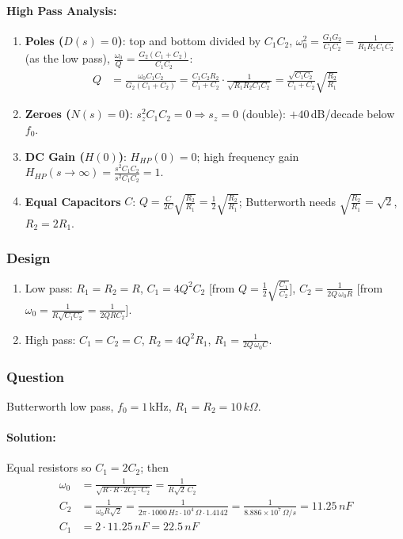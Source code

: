 \paragraph{High Pass Analysis:}
\begin{enumerate}
  \item \textbf{Poles (\(D(s) = 0\))}: top and bottom divided by \(C_1 C_2\),
    \(\omega_0^2 = \frac{G_1 G_2}{C_1 C_2} = \frac{1}{R_1 R_2 C_1 C_2}\) (as the low pass),
    \(\frac{\omega_0}{Q} = \frac{G_2 (C_1 + C_2)}{C_1 C_2}\):
    \begin{align*}
      Q &= \frac{\omega_0 C_1 C_2}{G_2 (C_1 + C_2)} = \frac{C_1 C_2 R_2}{C_1 + C_2}\cdot\frac{1}{\sqrt{R_1 R_2 C_1 C_2}}
         = \frac{\sqrt{C_1 C_2}}{C_1 + C_2}\sqrt{\frac{R_2}{R_1}}
    \end{align*}
  \item \textbf{Zeroes (\(N(s) = 0\))}: \(s_z^2 C_1 C_2 = 0 \Rightarrow s_z = 0\) (double): \(+40\,\)dB/decade below \(f_0\).
  \item \textbf{DC Gain (\(H(0)\))}: \(H_{HP}(0) = 0\); high frequency gain
    \(H_{HP}(s \to \infty) = \frac{s^2 C_1 C_2}{s^2 C_1 C_2} = 1\).
  \item \textbf{Equal Capacitors} \(C\): \(Q = \frac{C}{2C}\sqrt{\frac{R_2}{R_1}} = \frac{1}{2}\sqrt{\frac{R_2}{R_1}}\);
    Butterworth needs \(\sqrt{\frac{R_2}{R_1}} = \sqrt{2}\), \(R_2 = 2R_1\).
\end{enumerate}

\subsubsection{Design}
\begin{enumerate}
  \item Low pass: \(R_1 = R_2 = R\), \(C_1 = 4Q^2 C_2\) [from \(Q = \frac{1}{2}\sqrt{\frac{C_1}{C_2}}\)],
    \(C_2 = \frac{1}{2Q\,\omega_0 R}\) [from \(\omega_0 = \frac{1}{R\sqrt{C_1 C_2}} = \frac{1}{2Q R C_2}\)].
  \item High pass: \(C_1 = C_2 = C\), \(R_2 = 4Q^2 R_1\), \(R_1 = \frac{1}{2Q\,\omega_0 C}\).
\end{enumerate}

\subsubsection{Question}
Butterworth low pass, \(f_0 = 1\,\)kHz, \(R_1 = R_2 = 10\,k\Omega\).
\paragraph{Solution:}
Equal resistors so \(C_1 = 2C_2\); then
\begin{align*}
  \omega_0 &= \frac{1}{\sqrt{R \cdot R \cdot 2C_2 \cdot C_2}} = \frac{1}{R\sqrt{2}\,C_2} \\
  C_2 &= \frac{1}{\omega_0 R \sqrt{2}} = \frac{1}{2\pi \cdot 1000\,Hz \cdot 10^4\,\Omega \cdot 1.4142}
       = \frac{1}{8.886 \times 10^7\,\Omega/s} = 11.25\,nF \\
  C_1 &= 2 \cdot 11.25\,nF = 22.5\,nF
\end{align*}

